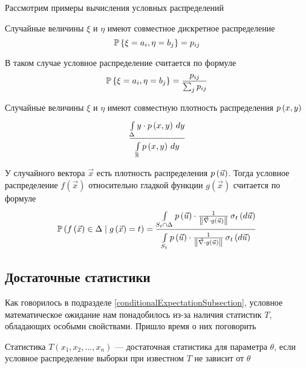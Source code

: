 Рассмотрим примеры вычисления условных распределений

\begin{example}
    Случайные величины $\xi$ и $\eta$ имеют совместное дискретное распределение
    $$\Probability{\xi = a_i, \eta = b_j} = p_{ij}$$

    В таком случае условное распределение считается по формуле
    $$\Probability{\xi = a_i, \eta = b_j} = \frac{p_{ij}}{\sum_j p_{ij}}$$
\end{example}

\begin{example}
    Случайные величины $\xi$ и $\eta$ имеют
    совместную плотность распределения $\pdf{x,y}$
        $$\frac{\integral{\Delta}{}{y}{y \cdot \pdf{x,y}}}
            {\integral{\mathbb{R}}{}{y}{\pdf{x,y}}}$$
\end{example}

\begin{example}
    У случайного вектора $\vec{x}$ есть плотность распределения $\pdf{\vec{u}}$.
    Тогда условное распределение $f\left( \vec{x} \right)$ относительно
    гладкой функции $g\left( \vec{x} \right)$ считается по формуле
    $$\probability{f\left( \vec{x} \right) \in \Delta
        \mid g\left( \vec{x} \right) = t}
        = \frac{\integrall{S_t \cap \Delta}{\sigma_{t}\left(d\vec{u} \right)}{
            \pdf{\vec{u}} \cdot \frac{1}{
                \left\| \vec{\nabla} \cdot g\left( \vec{u} \right) \right\|}}}
            {\integrall{S_t}{\sigma_{t}\left(d\vec{u} \right)}{
                \pdf{\vec{u}} \cdot \frac{1}{
                    \left\| \vec{\nabla}
                        \cdot g\left( \vec{u} \right) \right\|}}}$$
\end{example}

\subsection{Достаточные статистики}
Как говорилось в подразделе \ref{conditionalExpectationSubsection},
условное математическое ожидание нам понадобилось из-за наличия
статистик $T$, обладающих особыми свойствами.
Пришло время о них поговорить

\begin{definition}
    Статистика $T\left( x_1, x_2, \dots, x_n \right)$ --- достаточная статистика
    для параметра $\theta$, если условное распределение выборки
    при известном $T$ не зависит от $\theta$
\end{definition}
